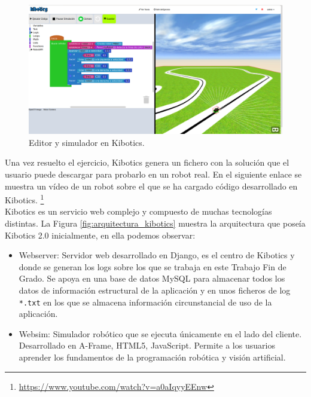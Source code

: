 \documentclass[a4paper, 12pt]{book}
\begin{document}
		\begin{figure}[H]
			\centering
			\includegraphics[width=13cm, keepaspectratio]{img/websim-siguelinea.png}
			\caption{Editor y simulador en Kibotics.}
			\label{fig:editor_simulador_kibotics}
		\end{figure}
		
		Una vez resuelto el ejercicio, Kibotics genera un fichero con la solución que el usuario puede descargar para probarlo en un robot real. En el siguiente enlace se muestra un vídeo de un robot sobre el que se ha cargado código desarrollado en Kibotics. \footnote{\url{https://www.youtube.com/watch?v=a0aIqyyEEnw}} \\
		
		Kibotics es un servicio web complejo y compuesto de muchas tecnologías distintas. La Figura \ref{fig:arquitectura_kibotics} muestra la arquitectura que poseía Kibotics 2.0 inicialmente, en ella podemos observar:
		
		\begin{itemize}
			\item Webserver: Servidor web desarrollado en Django, es el centro de Kibotics y donde se generan los logs sobre los que se trabaja en este Trabajo Fin de Grado. Se apoya en una base de datos MySQL para almacenar todos los datos de información estructural de la aplicación y en unos ficheros de log \texttt{*.txt} en los que se almacena información circunstancial de uso de la aplicación.
						
			\item Websim: Simulador robótico que se ejecuta únicamente en el lado del cliente. Desarrollado en A-Frame, HTML5, JavaScript. Permite a los usuarios aprender los fundamentos de la programación robótica y visión artificial.
		\end{itemize}
		
\end{document}
